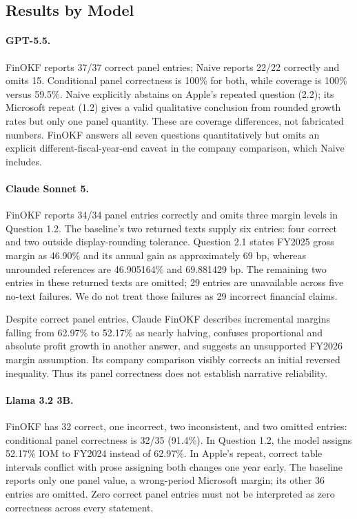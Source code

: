 \documentclass[letterpaper]{article} %
\begin{document}
\subsection{Results by Model}
\paragraph{GPT-5.5.}
FinOKF reports 37/37 correct panel entries; Naive reports 22/22 correctly and omits 15. Conditional panel correctness is 100\% for both, while coverage is 100\% versus 59.5\%. Naive explicitly abstains on Apple's repeated question (2.2); its Microsoft repeat (1.2) gives a valid qualitative conclusion from rounded growth rates but only one panel quantity. These are coverage differences, not fabricated numbers. FinOKF answers all seven questions quantitatively but omits an explicit different-fiscal-year-end caveat in the company comparison, which Naive includes.

\paragraph{Claude Sonnet 5.}
FinOKF reports 34/34 panel entries correctly and omits three margin levels in Question 1.2. The baseline's two returned texts supply six entries: four correct and two outside display-rounding tolerance. Question 2.1 states FY2025 gross margin as 46.90\% and its annual gain as approximately 69 bp, whereas unrounded references are 46.905164\% and 69.881429 bp. The remaining two entries in these returned texts are omitted; 29 entries are unavailable across five no-text failures. We do not treat those failures as 29 incorrect financial claims.

Despite correct panel entries, Claude FinOKF describes incremental margins falling from 62.97\% to 52.17\% as nearly halving, confuses proportional and absolute profit growth in another answer, and suggests an unsupported FY2026 margin assumption. Its company comparison visibly corrects an initial reversed inequality. Thus its panel correctness does not establish narrative reliability.

\paragraph{Llama 3.2 3B.}
FinOKF has 32 correct, one incorrect, two inconsistent, and two omitted entries: conditional panel correctness is 32/35 (91.4\%). In Question 1.2, the model assigns 52.17\% IOM to FY2024 instead of 62.97\%. In Apple's repeat, correct table intervals conflict with prose assigning both changes one year early. The baseline reports only one panel value, a wrong-period Microsoft margin; its other 36 entries are omitted. Zero correct panel entries must not be interpreted as zero correctness across every statement.
\end{document}
